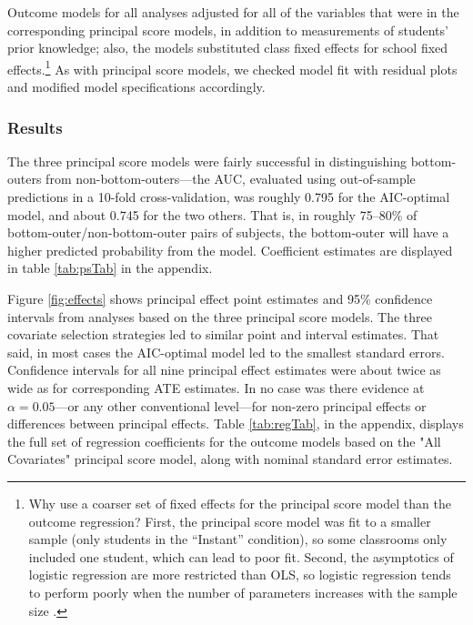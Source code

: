 \documentclass[]{article}
\begin{document}
Outcome models for all analyses adjusted for all of the variables that were in the corresponding principal score models, in addition to measurements of students' prior knowledge; also, the models substituted class fixed effects for school fixed effects.\footnote{Why use a coarser set of fixed effects for the principal score model than the outcome regression? First, the principal score model was fit to a smaller sample (only students in the ``Instant'' condition), so some classrooms only included one student, which can lead to poor fit. Second, the asymptotics of logistic regression are more restricted than OLS, so logistic regression tends to perform poorly when the number of parameters increases with the sample size \citep{agresti}.}
As with principal score models, we checked model fit with residual plots and modified model specifications accordingly.



\subsubsection{Results}

The three principal score models were fairly successful in distinguishing bottom-outers from non-bottom-outers---the AUC, evaluated using out-of-sample predictions in a 10-fold cross-validation, was roughly 0.795 for the AIC-optimal model, and about 0.745 for the two others. That is, in roughly 75--80\% of bottom-outer/non-bottom-outer pairs of subjects, the bottom-outer will have a higher predicted probability from the model.
Coefficient estimates are displayed in table \ref{tab:psTab} in the appendix.

Figure \ref{fig:effects} shows principal effect point estimates and 95\% confidence intervals from analyses based on the three principal score models.
The three covariate selection strategies led to similar point and interval estimates.
That said, in most cases the AIC-optimal model led to the smallest standard errors.
Confidence intervals for all nine principal effect estimates were about twice as wide as for corresponding ATE estimates.
In no case was there evidence at $\alpha=0.05$---or any other conventional level---for non-zero principal effects or differences between principal effects.
Table \ref{tab:regTab}, in the appendix, displays the full set of regression coefficients for the outcome models based on the "All Covariates" principal score model, along with nominal standard error estimates.
\end{document}
